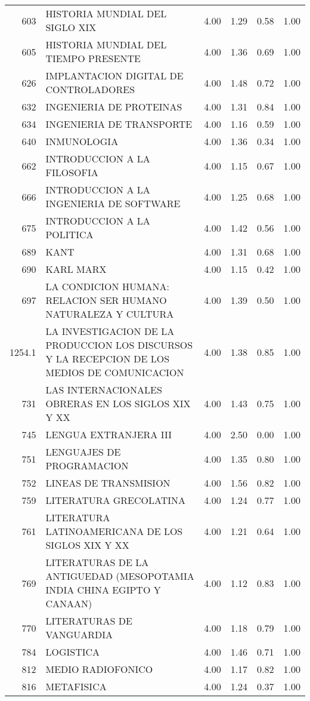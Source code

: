 \begin{table}[ht]
\begin{tabular}{rlrrrr}
  603 & HISTORIA MUNDIAL DEL SIGLO XIX & 4.00 & 1.29 & 0.58 & 1.00 \\ 
  605 & HISTORIA MUNDIAL DEL TIEMPO PRESENTE & 4.00 & 1.36 & 0.69 & 1.00 \\ 
  626 & IMPLANTACION DIGITAL DE CONTROLADORES & 4.00 & 1.48 & 0.72 & 1.00 \\ 
  632 & INGENIERIA DE PROTEINAS & 4.00 & 1.31 & 0.84 & 1.00 \\ 
  634 & INGENIERIA DE TRANSPORTE & 4.00 & 1.16 & 0.59 & 1.00 \\ 
  640 & INMUNOLOGIA & 4.00 & 1.36 & 0.34 & 1.00 \\ 
  662 & INTRODUCCION A LA FILOSOFIA & 4.00 & 1.15 & 0.67 & 1.00 \\ 
  666 & INTRODUCCION A LA INGENIERIA DE SOFTWARE & 4.00 & 1.25 & 0.68 & 1.00 \\ 
  675 & INTRODUCCION A LA POLITICA & 4.00 & 1.42 & 0.56 & 1.00 \\ 
  689 & KANT & 4.00 & 1.31 & 0.68 & 1.00 \\ 
  690 & KARL MARX & 4.00 & 1.15 & 0.42 & 1.00 \\ 
  697 & LA CONDICION HUMANA: RELACION SER HUMANO NATURALEZA Y CULTURA & 4.00 & 1.39 & 0.50 & 1.00 \\ 
  1254.1 & LA INVESTIGACION DE LA PRODUCCION LOS DISCURSOS Y LA RECEPCION DE LOS MEDIOS DE COMUNICACION & 4.00 & 1.38 & 0.85 & 1.00 \\ 
  731 & LAS INTERNACIONALES OBRERAS EN LOS SIGLOS XIX Y XX & 4.00 & 1.43 & 0.75 & 1.00 \\ 
  745 & LENGUA EXTRANJERA III & 4.00 & 2.50 & 0.00 & 1.00 \\ 
  751 & LENGUAJES DE PROGRAMACION & 4.00 & 1.35 & 0.80 & 1.00 \\ 
  752 & LINEAS DE TRANSMISION & 4.00 & 1.56 & 0.82 & 1.00 \\ 
  759 & LITERATURA GRECOLATINA & 4.00 & 1.24 & 0.77 & 1.00 \\ 
  761 & LITERATURA LATINOAMERICANA DE LOS SIGLOS XIX Y XX & 4.00 & 1.21 & 0.64 & 1.00 \\ 
  769 & LITERATURAS DE LA ANTIGUEDAD (MESOPOTAMIA INDIA CHINA EGIPTO Y CANAAN) & 4.00 & 1.12 & 0.83 & 1.00 \\ 
  770 & LITERATURAS DE VANGUARDIA & 4.00 & 1.18 & 0.79 & 1.00 \\ 
  784 & LOGISTICA & 4.00 & 1.46 & 0.71 & 1.00 \\ 
  812 & MEDIO RADIOFONICO & 4.00 & 1.17 & 0.82 & 1.00 \\ 
  816 & METAFISICA & 4.00 & 1.24 & 0.37 & 1.00 \\ 

\end{tabular}
\end{table}
